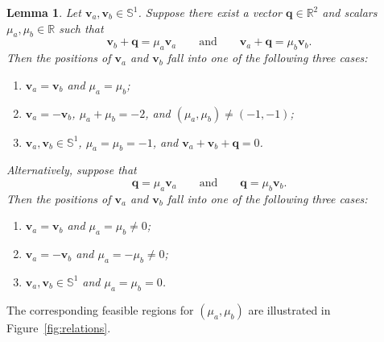 \documentclass[11pt,reqno]{amsart}
\newtheorem{lemma}[theorem]{Lemma}
\theoremstyle{definition}
\begin{document}
\begin{lemma}\label{geo}
Let $\mathbf{v}_a, \mathbf{v}_b \in \mathbb{S}^1$. Suppose there exist a vector $\boldsymbol q \in \mathbb{R}^2$ and scalars $\mu_a, \mu_b \in \mathbb{R}$ such that
\begin{equation}\label{acase1}
  \mathbf{v}_b + \boldsymbol q = \mu_a \mathbf{v}_a \qquad \mathrm{and} \qquad \mathbf{v}_a + \boldsymbol q = \mu_b \mathbf{v}_b.
\end{equation}
Then the positions of $\mathbf{v}_a$ and $\mathbf{v}_b$ fall into one of the following three cases:
\begin{enumerate}
    \item $\mathbf{v}_a = \mathbf{v}_b$ and $\mu_a = \mu_b$;
    \item $\mathbf{v}_a = -\mathbf{v}_b$, $\mu_a + \mu_b = -2$, and $(\mu_a, \mu_b) \neq (-1,-1)$;
    \item $\mathbf{v}_a, \mathbf{v}_b \in \mathbb{S}^1$, $\mu_a = \mu_b = -1$, and $\mathbf{v}_a + \mathbf{v}_b + \boldsymbol q = 0$.
\end{enumerate}
Alternatively, suppose that
\begin{equation}\label{acase2}
   \boldsymbol q  =  \mu_a \mathbf{v}_a \qquad \mathrm{and} \qquad \boldsymbol q  = \mu_b \mathbf{v}_b.
\end{equation}
Then the positions of $\mathbf{v}_a$ and $\mathbf{v}_b$ fall into one of the following three cases:
\begin{enumerate}
    \item $\mathbf{v}_a = \mathbf{v}_b$ and $\mu_a = \mu_b \ne 0$;
    \item $\mathbf{v}_a = -\mathbf{v}_b$ and $\mu_a = -\mu_b \ne 0$;
    \item $\mathbf{v}_a, \mathbf{v}_b \in \mathbb{S}^1$ and $\mu_a = \mu_b = 0$.
\end{enumerate}
\end{lemma}
The corresponding feasible regions for $(\mu_a,\mu_b)$ are illustrated in Figure~\ref{fig:relations}.
\end{document}
